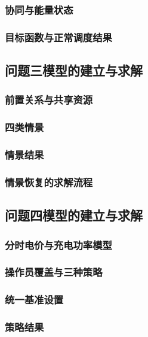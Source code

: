 \documentclass[withoutpreface,bwprint]{cumcmthesis}
\begin{document}
\subsubsection{协同与能量状态}

\subsubsection{目标函数与正常调度结果}

\subsection{问题三模型的建立与求解}

\subsubsection{前置关系与共享资源}

\subsubsection{四类情景}

\subsubsection{情景结果}

\subsubsection{情景恢复的求解流程}

\subsection{问题四模型的建立与求解}

\subsubsection{分时电价与充电功率模型}

\subsubsection{操作员覆盖与三种策略}

\subsubsection{统一基准设置}

\subsubsection{策略结果}
\end{document}
